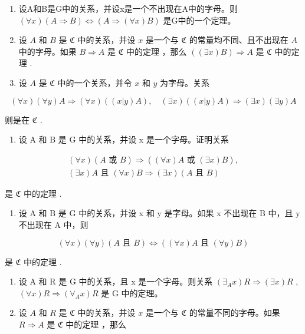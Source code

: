 \begin{enumerate}
\def\labelenumi{\arabic{enumi}.}
\item
  设A和B是G中的关系，并设x是一个不出现在A中的字母。则 \((\forall x)(A \Longrightarrow B) \Longleftrightarrow (A \Longrightarrow (\forall x)B)\) 是G中的一个定理。
\item
  设 \(A\) 和 \(B\) 是 \(\mathfrak{C}\) 中的关系，并设 \(x\) 是一个与 \(\mathfrak{C}\) 的常量均不同、且不出现在 \(A\) 中的字母。如果 \(B \Longrightarrow A\) 是 \(\mathfrak{C}\) 中的定理 ，那么 \(((\exists x)B) \Longrightarrow A\) 是 \(\mathfrak{C}\) 中的定理 .
\item
  设 \(A\) 是 \(\mathfrak{C}\) 中的一个关系，并令 \(x\) 和 \(y\) 为字母。关系
\end{enumerate}

\[
(\forall x) (\forall y) A \Longrightarrow (\forall x) ((x | y) A), \quad (\exists x) ((x | y) A) \Longrightarrow (\exists x) (\exists y) A
\]

则是在 \(\mathfrak{C}\) .

\begin{enumerate}
\def\labelenumi{\arabic{enumi}.}
\setcounter{enumi}{3}
\tightlist
\item
  设 A 和 B 是 G 中的关系，并设 x 是一个字母。证明关系
\end{enumerate}

\[
\begin{array}{l} (\forall x) (A \text { 或 } B) \Longrightarrow ((\forall x) A \text { 或 } (\exists x) B), \\ (\exists x) A \text { 且 } (\forall x) B \Longrightarrow (\exists x) (A \text { 且 } B) \end{array}
\]

是 \(\mathfrak{C}\) 中的定理 .

\begin{enumerate}
\def\labelenumi{\arabic{enumi}.}
\setcounter{enumi}{4}
\tightlist
\item
  设 A 和 B 是 G 中的关系，并设 x 和 y 是字母。如果 x 不出现在 B 中，且 y 不出现在 A 中，则
\end{enumerate}

\[
(\forall x) (\forall y) (A \text {   且   } B) \iff ((\forall x) A \text {   且   } (\forall y) B)
\]

是 \(\mathfrak{C}\) 中的定理 .

\begin{enumerate}
\def\labelenumi{\arabic{enumi}.}
\setcounter{enumi}{5}
\item
  设 A 和 R 是 G 中的关系，且 x 是一个字母。则关系 \((\exists_{A}x)R \Longrightarrow (\exists x)R\) , \((\forall x)R \Longrightarrow (\forall_{A}x)R\) 是 G 中的定理。
\item
  设 \(A\) 和 \(R\) 是 \(\mathfrak{C}\) 中的关系，并设 \(x\) 是一个与 \(\mathfrak{C}\) 的常量不同的字母。如果 \(R \Longrightarrow A\) 是 \(\mathfrak{C}\) 中的定理 ，那么
\end{enumerate}


